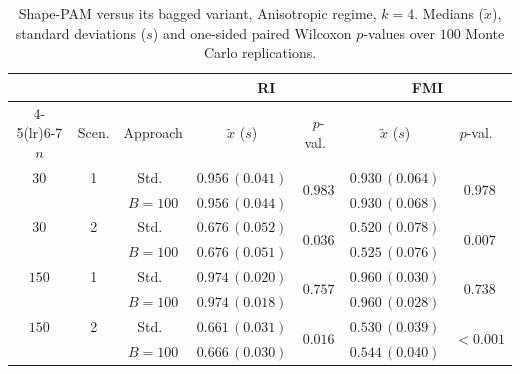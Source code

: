 \begin{table}[h]
\centering
\caption{Shape-PAM versus its bagged variant, Anisotropic regime, $k=4$. Medians ($\tilde x$), standard deviations ($s$) and one-sided paired Wilcoxon $p$-values over $100$ Monte Carlo replications.}
\label{tab:pam-aniso-k4}
\footnotesize
\begin{tabular}{cc c cc cc}
\toprule
& & & \multicolumn{2}{c}{\textbf{RI}} & \multicolumn{2}{c}{\textbf{FMI}} \\
\cmidrule(lr){4-5}\cmidrule(lr){6-7}
$n$ & Scen. & Approach & $\tilde x$ ($s$) & $p$-val.\ & $\tilde x$ ($s$) & $p$-val.\ \\
\midrule
$30$ & 1 & Std.\ & $0.956\,(0.041)$ & \multirow{2}{*}{$0.983$} & $0.930\,(0.064)$ & \multirow{2}{*}{$0.978$} \\
     &   & $B{=}100$ & $0.956\,(0.044)$ & & $0.930\,(0.068)$ & \\
$30$ & 2 & Std.\ & $0.676\,(0.052)$ & \multirow{2}{*}{$\mathbf{0.036}$} & $0.520\,(0.078)$ & \multirow{2}{*}{$\mathbf{0.007}$} \\
     &   & $B{=}100$ & $0.676\,(0.051)$ & & $0.525\,(0.076)$ & \\
$150$ & 1 & Std.\ & $0.974\,(0.020)$ & \multirow{2}{*}{$0.757$} & $0.960\,(0.030)$ & \multirow{2}{*}{$0.738$} \\
     &   & $B{=}100$ & $0.974\,(0.018)$ & & $0.960\,(0.028)$ & \\
$150$ & 2 & Std.\ & $0.661\,(0.031)$ & \multirow{2}{*}{$\mathbf{0.016}$} & $0.530\,(0.039)$ & \multirow{2}{*}{$\mathbf{<\!0.001}$} \\
     &   & $B{=}100$ & $0.666\,(0.030)$ & & $0.544\,(0.040)$ & \\
\bottomrule
\end{tabular}
\end{table}

